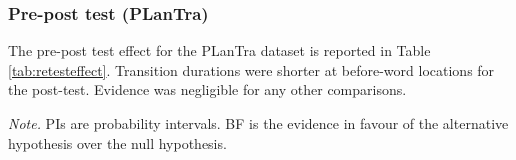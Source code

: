 \begin{appendix}
\begin{center}
\begin{ThreePartTable}
{}

\end{ThreePartTable}
\end{center}
\elandscape

\hypertarget{pre-post-test-plantra}{%
\subsubsection{Pre-post test (PLanTra)}\label{pre-post-test-plantra}}

The pre-post test effect for the PLanTra dataset is reported in Table
\ref{tab:retesteffect}. Transition durations were shorter at before-word
locations for the post-test. Evidence was negligible for any other
comparisons.

\begin{center}
\begin{ThreePartTable}

\begin{TableNotes}[para]
\normalsize{\textit{Note.} PIs are probability intervals. BF is the evidence in favour of the alternative hypothesis over the null hypothesis.}
\end{TableNotes}

\footnotesize{

}
\end{ThreePartTable}
\end{center}
\end{appendix}
